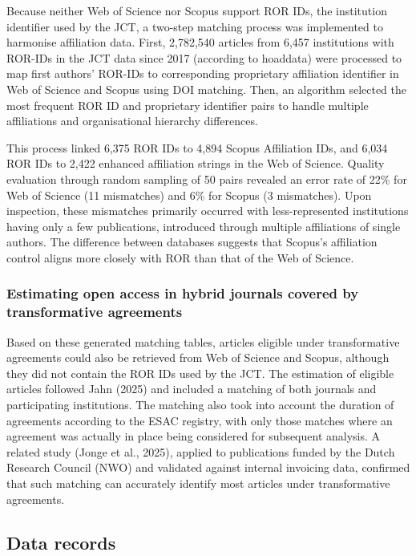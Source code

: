 \documentclass[a4paper,man,floatsintext,longtable,noextraspace,10pt]{apa6}
\begin{document}
Because neither Web of Science nor Scopus support ROR IDs, the
institution identifier used by the JCT, a two-step matching process was
implemented to harmonise affiliation data. First, 2,782,540 articles
from 6,457 institutions with ROR-IDs in the JCT data since 2017
(according to hoaddata) were processed to map first authors' ROR-IDs to
corresponding proprietary affiliation identifier in Web of Science and
Scopus using DOI matching. Then, an algorithm selected the most frequent
ROR ID and proprietary identifier pairs to handle multiple affiliations
and organisational hierarchy differences.

This process linked 6,375 ROR IDs to 4,894 Scopus Affiliation IDs, and
6,034 ROR IDs to 2,422 enhanced affiliation strings in the Web of
Science. Quality evaluation through random sampling of 50 pairs revealed
an error rate of 22\% for Web of Science (11 mismatches) and 6\% for
Scopus (3 mismatches). Upon inspection, these mismatches primarily
occurred with less-represented institutions having only a few
publications, introduced through multiple affiliations of single
authors. The difference between databases suggests that Scopus's
affiliation control aligns more closely with ROR than that of the Web of
Science.

\subsubsection{Estimating open access in hybrid journals covered by
transformative
agreements}\label{estimating-open-access-in-hybrid-journals-covered-by-transformative-agreements}

Based on these generated matching tables, articles eligible under
transformative agreements could also be retrieved from Web of Science
and Scopus, although they did not contain the ROR IDs used by the JCT.
The estimation of eligible articles followed Jahn (2025) and included a
matching of both journals and participating institutions. The matching
also took into account the duration of agreements according to the ESAC
registry, with only those matches where an agreement was actually in
place being considered for subsequent analysis. A related study (Jonge
et al., 2025), applied to publications funded by the Dutch Research
Council (NWO) and validated against internal invoicing data, confirmed
that such matching can accurately identify most articles under
transformative agreements.

\subsection{Data records}\label{data-records}
\end{document}

